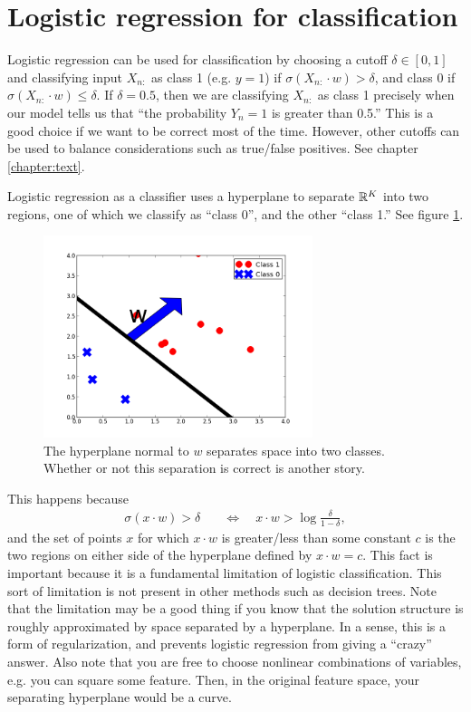 \section{Logistic regression for classification}

Logistic regression can be used for classification by choosing a cutoff $\delta\in[0,1]$ and classifying input $X_{n:}$ as class 1 (e.g. $y=1$) if $\sigma(X_{n:}\cdot w) > \delta$, and class 0 if $\sigma(X_{n:}\cdot w) \leq \delta$.  If $\delta=0.5$, then we are classifying $X_{n:}$ as class 1 precisely when our model tells us that ``the probability $Y_n=1$ is greater than 0.5.''  This is a good choice if we want to be correct most of the time.  However, other cutoffs can be used to balance considerations such as true/false positives.  See chapter \ref{chapter:text}.

Logistic regression as a classifier uses a hyperplane to separate ${\mathbb R}^K$ into two regions, one of which we classify as ``class 0'', and the other ``class 1.''  See figure \ref{logistic:figure:separating-hyperplane}.
\begin{figure}
  \label{logistic:figure:separating-hyperplane}
  \includegraphics[width=0.7\textwidth]{../images/logistic_classifier}
  \caption{The hyperplane normal to $w$ separates space into two classes.  Whether or not this separation is correct is another story.}
\end{figure}
This happens because 
\begin{align*}
  \sigma(x\cdot w) > \delta &\quad\Leftrightarrow\quad x\cdot w > \log\frac{\delta}{1-\delta},
\end{align*}
and the set of points $x$ for which $x\cdot w$ is greater/less than some constant $c$ is the two regions on either side of the hyperplane defined by $x\cdot w = c$.  This fact is important because it is a fundamental limitation of logistic classification.  This sort of limitation is not present in other methods such as decision trees.  Note that the limitation may be a good thing if you know that the solution structure is roughly approximated by space separated by a hyperplane.  In a sense, this is a form of regularization, and prevents logistic regression from giving a ``crazy'' answer.  Also note that you are free to choose nonlinear combinations of variables, e.g. you can square some feature.  Then, in the original feature space, your separating hyperplane would be a curve.

